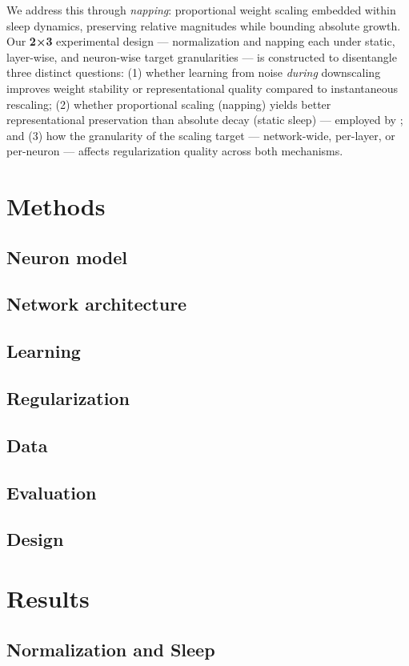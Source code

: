 \documentclass[runningheads]{llncs}
\begin{document}
We address this through \textit{napping}: proportional weight scaling embedded within sleep dynamics, preserving relative magnitudes while bounding absolute growth. Our \textbf{2×3} experimental design — normalization and napping each under static, layer-wise, and neuron-wise target granularities — is constructed to disentangle three distinct questions: (1) whether learning from noise \textit{during} downscaling improves weight stability or representational quality compared to instantaneous rescaling; (2) whether proportional scaling (napping) yields better representational preservation than absolute decay (static sleep) — employed by \cite{massey_sleep-based_2026}; and (3) how the granularity of the scaling target — network-wide, per-layer, or per-neuron — affects regularization quality across both mechanisms.



\section{Methods}
\subsection{Neuron model}
\subsection{Network architecture}
\subsection{Learning}
\subsection{Regularization}
\subsection{Data}
\subsection{Evaluation}
\subsection{Design}

\section{Results}
\subsection{Normalization and Sleep}
\end{document}
